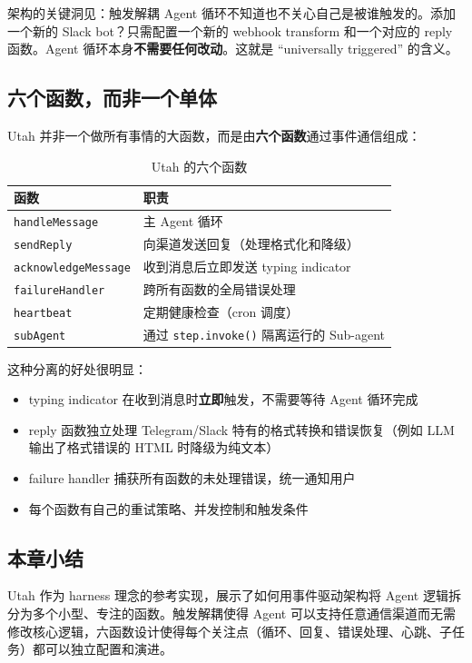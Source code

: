 \begin{importantbox}{架构的关键洞见：触发解耦}
Agent 循环不知道也不关心自己是被谁触发的。添加一个新的 Slack bot？只需配置一个新的 webhook transform 和一个对应的 reply 函数。Agent 循环本身\textbf{不需要任何改动}。这就是 ``universally triggered'' 的含义。
\end{importantbox}

\subsection{六个函数，而非一个单体}

Utah 并非一个做所有事情的大函数，而是由\textbf{六个函数}通过事件通信组成：

\begin{table}[H]
\centering
\caption{Utah 的六个函数}
\begin{tabular}{ll}
\toprule
\textbf{函数} & \textbf{职责} \\
\midrule
\texttt{handleMessage} & 主 Agent 循环 \\
\texttt{sendReply} & 向渠道发送回复（处理格式化和降级） \\
\texttt{acknowledgeMessage} & 收到消息后立即发送 typing indicator \\
\texttt{failureHandler} & 跨所有函数的全局错误处理 \\
\texttt{heartbeat} & 定期健康检查（cron 调度） \\
\texttt{subAgent} & 通过 \texttt{step.invoke()} 隔离运行的 Sub-agent \\
\bottomrule
\end{tabular}
\end{table}

这种分离的好处很明显：
\begin{itemize}
    \item typing indicator 在收到消息时\textbf{立即}触发，不需要等待 Agent 循环完成
    \item reply 函数独立处理 Telegram/Slack 特有的格式转换和错误恢复（例如 LLM 输出了格式错误的 HTML 时降级为纯文本）
    \item failure handler 捕获所有函数的未处理错误，统一通知用户
    \item 每个函数有自己的重试策略、并发控制和触发条件
\end{itemize}

\subsection{本章小结}

Utah 作为 harness 理念的参考实现，展示了如何用事件驱动架构将 Agent 逻辑拆分为多个小型、专注的函数。触发解耦使得 Agent 可以支持任意通信渠道而无需修改核心逻辑，六函数设计使得每个关注点（循环、回复、错误处理、心跳、子任务）都可以独立配置和演进。


